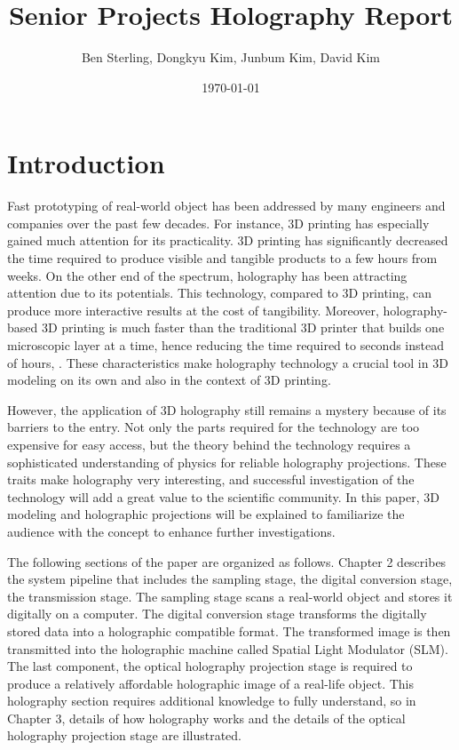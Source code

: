 \documentclass[12pt]{article}
\title{Senior Projects Holography Report}
\date{\today}
\author{Ben Sterling, Dongkyu Kim, Junbum Kim, David Kim}
\begin{document}
\maketitle
\clearpage

\section{Introduction}
\qquad
Fast prototyping of real-world object has been addressed by many engineers and companies over the past few decades. For instance, 3D printing has especially gained much attention for its practicality. 3D printing has significantly decreased the time required to produce visible and tangible products to a few hours from weeks. On the other end of the spectrum, holography has been attracting attention due to its potentials. This technology, compared to 3D printing, can produce more interactive results at the cost of tangibility. Moreover, holography-based 3D printing is much faster than the traditional 3D printer that builds one microscopic layer at a time, hence reducing the time required to seconds instead of hours,  \cite{Shusteffeaao5496}. These characteristics make holography technology a crucial tool in 3D modeling on its own and also in the context of 3D printing.

However, the application of 3D holography still remains a mystery because of its barriers to the entry. Not only the parts required for the technology are too expensive for easy access, but the theory behind the technology requires a sophisticated understanding of physics for reliable holography projections. These traits make holography very interesting, and successful investigation of the technology will add a great value to the scientific community. In this paper, 3D modeling and holographic projections will be explained to familiarize the audience with the concept to enhance further investigations.

\par
The following sections of the paper are organized as follows. Chapter 2 describes the system pipeline that includes the sampling stage, the digital conversion stage, the transmission stage. The sampling stage scans a real-world object and stores it digitally on a computer. The digital conversion stage transforms the digitally stored data into a holographic compatible format. The transformed image is then transmitted into the holographic machine called Spatial Light Modulator (SLM). The last component, the optical holography projection stage is required to produce a relatively affordable holographic image of a real-life object. This holography section requires additional knowledge to fully understand, so in Chapter 3, details of how holography works and the details of the optical holography projection stage are illustrated.
\end{document}
